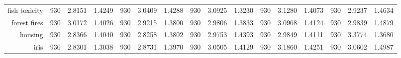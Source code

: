 \begin{table}[htbp]
{\begin{tabular}{rccccccccccccccc}
			fish toxicity                       & 930                                     & \cellcolor[rgb]{ .776,  .937,  .808}\textcolor[rgb]{ 0,  .38,  0}{2.8151}          & 1.4249          & 930                             & 3.0409                                                                    & 1.4288          & 930                             & 3.0925          & 1.3230          & 930                             & 3.1280                                                                    & 1.4073          & 930                             & 2.9237                                                                    & 1.4634          \\
			forest fires                        & 930                                     & 3.0172                                                                             & 1.4026          & 930                             & \cellcolor[rgb]{ .776,  .937,  .808}\textcolor[rgb]{ 0,  .38,  0}{2.9215} & 1.3800          & 930                             & 2.9806          & 1.3833          & 930                             & 3.0968                                                                    & 1.4124          & 930                             & 2.9839                                                                    & 1.4879          \\
			housing                             & 930                                     & 2.8366                                                                             & 1.4040          & 930                             & \cellcolor[rgb]{ .776,  .937,  .808}\textcolor[rgb]{ 0,  .38,  0}{2.8258} & 1.3802          & 930                             & 2.9753          & 1.4393          & 930                             & 2.9849                                                                    & 1.4111          & 930                             & 3.3774                                                                    & 1.3680          \\
			iris                                & 930                                     & \cellcolor[rgb]{ .776,  .937,  .808}\textcolor[rgb]{ 0,  .38,  0}{2.8301}          & 1.3038          & 930                             & 2.8731                                                                    & 1.3970          & 930                             & 3.0505          & 1.4129          & 930                             & 3.1860                                                                    & 1.4251          & 930                             & 3.0602                                                                    & 1.4987          \\

\end{tabular}}
\end{table}
